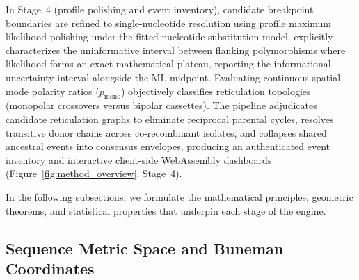In Stage~4 (profile polishing and event inventory), candidate breakpoint boundaries are refined to single-nucleotide resolution using profile maximum likelihood polishing under the fitted nucleotide substitution model.
\RhizAeon explicitly characterizes the uninformative interval between flanking polymorphisms where likelihood forms an exact mathematical plateau, reporting the informational uncertainty interval alongside the ML midpoint.
Evaluating continuous spatial mode polarity ratios ($p_{\text{mono}}$) objectively classifies reticulation topologies (monopolar crossovers versus bipolar cassettes).
The pipeline adjudicates candidate reticulation graphs to eliminate reciprocal parental cycles, resolves transitive donor chains across co-recombinant isolates, and collapses shared ancestral events into consensus envelopes, producing an authenticated event inventory and interactive client-side WebAssembly dashboards (Figure~\ref{fig:method_overview}, Stage~4).

In the following subsections, we formulate the mathematical principles, geometric theorems, and statistical properties that underpin each stage of the \RhizAeon engine.

\subsection{Sequence Metric Space and Buneman Coordinates}
\label{subsec:metric_space}


